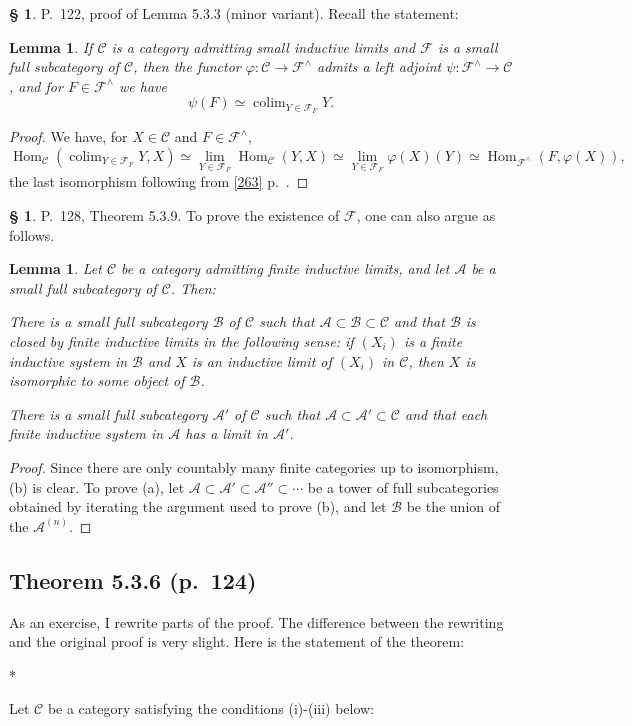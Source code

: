 \documentclass[12pt]{article}
\newtheorem{lem}[thm]{Lemma}
\theoremstyle{remark}
\theoremstyle{definition}
\newtheorem{s}[thm]{\S}
\newcommand{\A}{\mathcal A}
\newcommand{\B}{\mathcal B}
\newcommand{\C}{\mathcal C}
\newcommand{\F}{\mathcal F}
\newcommand{\mv}{ (minor variant)}
\DeclareMathOperator*{\co}{colim}
\DeclareMathOperator{\Hom}{Hom}%
\begin{document}
%
%
\begin{s} 
P.~122, proof of Lemma 5.3.3\mv. Recall the statement: 
%
\begin{lem}
If $\C$ is a category admitting small inductive limits and $\F$ is a small full subcategory of $\C$, then the functor $\varphi:\C\to\F^\wedge$ admits a left adjoint $\psi:\F^\wedge\to\C$, and for $F\in\F^\wedge$ we have 
$$
\psi(F)\simeq\co_{Y\in\F_F}Y. 
$$ 
\end{lem} 
%
\begin{proof}
We have, for $X\in\C$ and $F\in\F^\wedge$, 
$$
\Hom_\C\left(\co_{Y\in\F_F}Y,X\right)\simeq\lim_{Y\in\F_F}\Hom_\C(Y,X)
\simeq\lim_{Y\in\F_F}\varphi(X)(Y)\simeq\Hom_{\F^\wedge}(F,\varphi(X)),
$$  
the last isomorphism following from \eqref{263} p.~\pageref{263}.
\end{proof}
\end{s}
%
%
\begin{s} 
P.~128, Theorem 5.3.9. To prove the existence of $\F$, one can also argue as follows. 
%
\begin{lem} 
%
Let $\C$ be a category admitting finite inductive limits, and let $\A$ be a small full subcategory of $\C$. Then:

 There is a small full subcategory $\B$ of $\C$ such that $\A\subset\B\subset \C$ and that $\B$ is closed by finite inductive limits in the following sense: if $(X_i)$ is a finite inductive system in $\B$ and $X$ is an inductive limit of $(X_i)$ in $\C$, then $X$ is isomorphic to some object of $\B$.

 There is a small full subcategory $\A'$ of $\C$ such that $\A\subset\A'\subset \C$ and that each finite inductive system in $\A$ has a limit in $\A'$. 
%
\end{lem} 
%
\begin{proof}
Since there are only countably many finite categories up to isomorphism, (b) is clear. To prove (a), let $\A\subset\A'\subset\A''\subset\cdots$ be a tower of full subcategories obtained by iterating the argument used to prove (b), and let $\B$ be the union of the $\A^{(n)}$.
\end{proof}
\end{s}
%
%
\subsection{Theorem 5.3.6 (p.~124)}
%
As an exercise, I rewrite parts of the proof. The difference between the rewriting and the original proof is very slight. Here is the statement of the theorem:%
%
\begin{center}*\end{center}
%
Let $\C$ be a category satisfying the conditions (i)-(iii) below:
\end{document}
